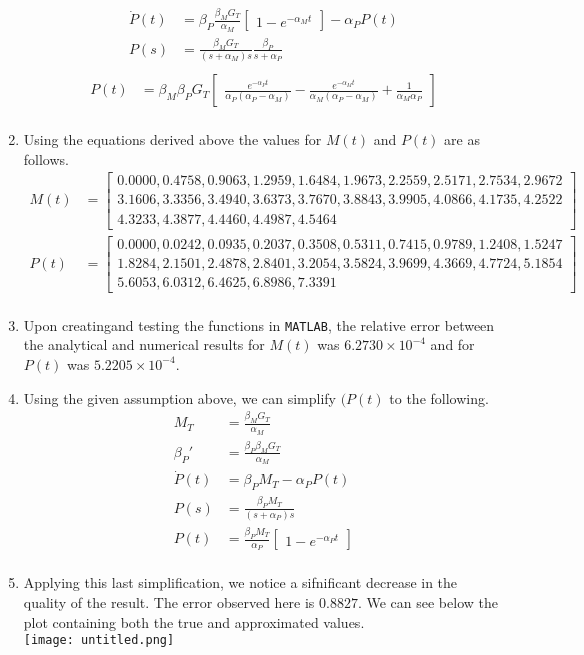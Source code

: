 \documentclass[10pt]{article}
\newcommand{\matlab}[1]{\texttt{#1}}
\newcommand{\bm}{\begin{bmatrix}}
\newcommand{\bb}{\end{bmatrix}}
\newcommand{\eul}[1]{e^{#1}}
\begin{document}
\begin{enumerate}
\begin{align*}
\dot{P}(t) &= \beta_P\frac{\beta_MG_T}{\alpha_M} \bm 1 - \eul{-\alpha_Mt} \bb - \alpha_PP(t) \\
P(s) &= \frac{\beta_MG_T}{(s + \alpha_M)s}\frac{\beta_P}{s + \alpha_P} \\
\end{align*}
\begin{align*}
P(t) &= \beta_M \beta_P G_T \bm \frac{\eul{-\alpha_Pt}}{\alpha_P(\alpha_P - \alpha_M)} - \frac{\eul{-\alpha_Mt}}{\alpha_M(\alpha_P - \alpha_M)} + \frac{1}{\alpha_M \alpha_P} \bb \\
\end{align*}
\item Using the equations derived above the values for $M(t)$ and $P(t)$ are as follows. \\
\begin{align*}
M(t) &= \bm 0.0000, 0.4758, 0.9063, 1.2959, 1.6484, 1.9673, 2.2559, 2.5171, 2.7534, 2.9672 \\ 3.1606, 3.3356, 3.4940, 3.6373, 3.7670, 3.8843, 3.9905, 4.0866, 4.1735, 4.2522 \\ 4.3233, 4.3877, 4.4460, 4.4987, 4.5464 \bb \\
P(t) &= \bm 0.0000, 0.0242, 0.0935, 0.2037, 0.3508, 0.5311, 0.7415, 0.9789, 1.2408, 1.5247 \\ 1.8284, 2.1501, 2.4878, 2.8401, 3.2054, 3.5824, 3.9699, 4.3669, 4.7724, 5.1854 \\ 5.6053, 6.0312, 6.4625, 6.8986, 7.3391 \bb \\
\end{align*}
\item Upon creatingand testing the functions in \matlab{MATLAB}, the relative error between the analytical and numerical results for $M(t)$ was $6.2730 \times 10^{-4}$ and for $P(t)$ was $5.2205 \times 10^{-4}$.
\item Using the given assumption above, we can simplify $(P(t)$ to the following. \\
\begin{align*}
M_T &= \frac{\beta_M G_T}{\alpha_M} \\
\beta_P' &= \frac{\beta_P \beta_M G_T}{\alpha_M} \\
\dot{P}(t) &= \beta_PM_T - \alpha_P P(t) \\
P(s) &= \frac{\beta_PM_T}{(s + \alpha_P)s} \\
P(t) &= \frac{\beta_PM_T}{\alpha_P} \bm 1 - \eul{-\alpha_Pt} \bb \\
\end{align*}
\item Applying this last simplification, we notice a sifnificant decrease in the quality of the result. The error observed here is $0.8827$. We can see below the plot containing both the true and approximated values.\\
\texttt{[image: untitled.png]}

\end{enumerate}
\end{document}
